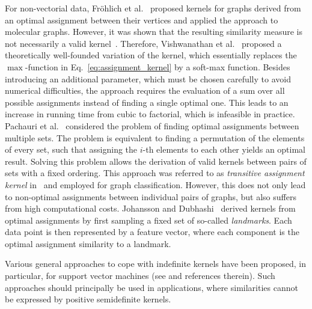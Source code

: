 \documentclass{article}
\begin{document}
For non-vectorial data, Fröhlich et al.~\cite{Frohlich2005} proposed kernels for 
graphs derived from an optimal assignment between their vertices and applied the 
approach to molecular graphs. However, it was shown that the resulting similarity
measure is not necessarily a valid kernel~\cite{Vert2008}.
Therefore, Vishwanathan et al.~\cite{Vishwanathan2010} proposed a theoretically 
well-founded variation of the kernel, which essentially replaces the 
$\max$-function in Eq.~\eqref{eq:assignment_kernel} by a soft-max function.
Besides introducing an additional parameter, which must be chosen carefully to 
avoid numerical difficulties, the approach requires the evaluation of a sum over all 
possible assignments instead of finding a single optimal one. 
This leads to an increase in running time from cubic to factorial, which is 
infeasible in practice.
Pachauri et al.~\cite{Pachauri2013} considered the problem of finding optimal assignments between 
multiple sets. The problem is equivalent to finding a permutation of the elements 
of every set, such that assigning the $i$-th elements to each other yields an 
optimal result.
Solving this problem allows the derivation of valid kernels between pairs of sets with a
fixed ordering. This approach was referred to as \emph{transitive assignment kernel}
in~\cite{Schiavinato2015} and employed for graph classification.
However, this does not only lead to non-optimal assignments between individual 
pairs of graphs, but also suffers from high computational costs.
Johansson and Dubhashi~\cite{Johansson2015} derived kernels from 
optimal assignments by first sampling a fixed set of so-called \emph{landmarks}. 
Each data point is then represented by a feature vector, where each component is 
the optimal assignment similarity to a landmark.

Various general approaches to cope with indefinite kernels have been proposed, 
in particular, for support vector machines (see \cite{Loosli2015} and references therein).
Such approaches should principally be used in applications, where similarities 
cannot be expressed by positive semidefinite kernels.
\end{document}
